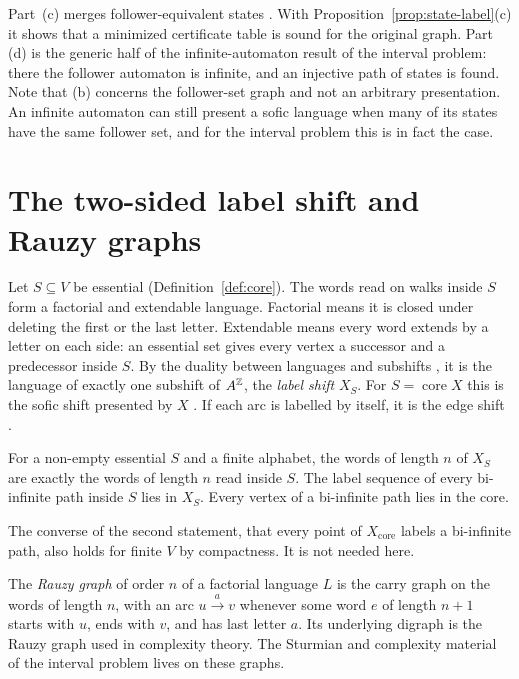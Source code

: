 Part~(c) merges follower-equivalent states \cite[Lemma~3.3.8]{LM95}. With
Proposition~\ref{prop:state-label}(c) it shows that a minimized certificate table is sound for
the original graph. Part (d) is the generic half of the infinite-automaton result of the
interval problem: there the follower automaton is infinite, and an injective path of states is
found. Note that (b) concerns the follower-set graph and not an arbitrary presentation. An
infinite automaton can still present a sofic language when many of its states have the same
follower set, and for the interval problem this is in fact the case.

\section{The two-sided label shift and Rauzy graphs}\label{sec:shift}

Let \(S\subseteq V\) be essential (Definition~\ref{def:core}). The words read on walks inside
\(S\) form a factorial and extendable language. Factorial means it is closed under deleting the
first or the last letter. Extendable means every word extends by a letter on each side: an
essential set gives every vertex a successor and a predecessor inside \(S\). By the duality
between languages and subshifts \cite[§1.3]{LM95}, it is the language of exactly one subshift
of \(A^{\mathbb{Z}}\), the \emph{label shift} \(X_S\). For \(S=\operatorname{core}X\) this is the sofic
shift presented by \(X\) \cite[Def.~3.1.3]{LM95}. If each arc is labelled by itself, it is the
edge shift \cite[Def.~2.2.5]{LM95}.

\begin{proposition}\label{prop:label-shift}
For a non-empty essential \(S\) and a finite alphabet, the words of length \(n\) of \(X_S\) are
exactly the words of length \(n\) read inside \(S\). The label sequence of every bi-infinite
path inside \(S\) lies in \(X_S\). Every vertex of a bi-infinite path lies in the core.
\end{proposition}

The converse of the second statement, that every point of \(X_{\operatorname{core}}\) labels a
bi-infinite path, also holds for finite \(V\) by compactness. It is not needed here.

The \emph{Rauzy graph} of order \(n\) of a factorial language \(L\) is the carry graph on the
words of length \(n\), with an arc \(u\xrightarrow{a}v\) whenever some word \(e\) of length
\(n+1\) starts with \(u\), ends with \(v\), and has last letter \(a\). Its underlying digraph is
the Rauzy graph used in complexity theory. The Sturmian and complexity material of the interval
problem lives on these graphs.

